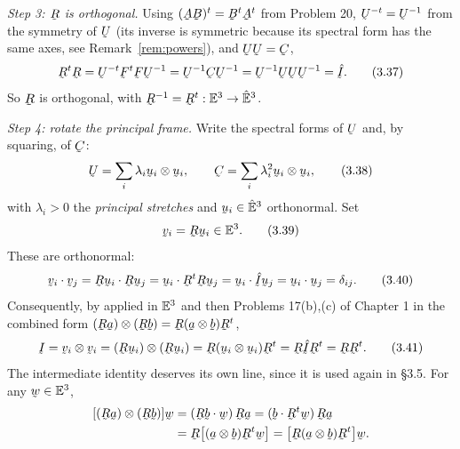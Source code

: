 \smallskip
\noindent
\emph{Step 3: $\bR$ is orthogonal.} Using $(\bA\bB)^{t}=\bB^{t}\bA^{t}$
from Problem 20, $\bU^{-t}=\bU^{-1}$ from the symmetry of $\bU$ (its
inverse is symmetric because its spectral form has the same axes, see
Remark~\ref{rem:powers}), and $\bU\bU=\bC$,
\begin{equation}
   \bR^{t}\bR=\bU^{-t}\bF^{t}\bF\bU^{-1}
             =\bU^{-1}\bC\bU^{-1}
             =\bU^{-1}\bU\bU\bU^{-1}=\hI .
   \tag{3.37}\label{eq:3.37}
\end{equation}
So $\bR$ is orthogonal, with $\bR^{-1}=\bR^{t}:\Vt\to\hVt$.

\smallskip
\noindent
\emph{Step 4: rotate the principal frame.} Write the spectral forms of
$\bU$ and, by squaring, of $\bC$:
\begin{equation}
   \bU=\sum_{i}\lambda_{i}\bu_{i}\otimes\bu_{i},
   \qquad
   \bC=\sum_{i}\lambda_{i}^{2}\bu_{i}\otimes\bu_{i},
   \tag{3.38}\label{eq:3.38}
\end{equation}
with $\lambda_{i}>0$ the \emph{principal stretches} and
$\bu_{i}\in\hVt$ orthonormal. Set
\begin{equation}
   \bv_{i}=\bR\bu_{i}\in\Vt .
   \tag{3.39}\label{eq:3.39}
\end{equation}
These are orthonormal:
\begin{equation}
   \ip{\bv_{i}}{\bv_{j}}=\ip{\bR\bu_{i}}{\bR\bu_{j}}
   =\ip{\bu_{i}}{\bR^{t}\bR\bu_{j}}=\ip{\bu_{i}}{\hI\bu_{j}}
   =\ip{\bu_{i}}{\bu_{j}}=\dd_{ij}.
   \tag{3.40}\label{eq:3.40}
\end{equation}
Consequently, by  applied in $\mathbb{E}^{3}$ and then Problems 17(b),(c) of
Chapter 1 in the combined form $(\bR\ba)\otimes(\bR\bb)=\bR(\ba\otimes
\bb)\bR^{t}$,
\begin{equation}
   \I=\bv_{i}\otimes\bv_{i}=(\bR\bu_{i})\otimes(\bR\bu_{i})
     =\bR(\bu_{i}\otimes\bu_{i})\bR^{t}=\bR\hI\bR^{t}=\bR\bR^{t}.
   \tag{3.41}\label{eq:3.41}
\end{equation}
The intermediate identity deserves its own line, since it is used again in
\S3.5. For any $\bw\in\Vt$,
\[
\begin{aligned}
   [(\bR\ba)\otimes(\bR\bb)]\bw
   &=(\ip{\bR\bb}{\bw})\,\bR\ba=(\ip{\bb}{\bR^{t}\bw})\,\bR\ba\\
   &=\bR\big[(\ba\otimes\bb)\bR^{t}\bw\big]
    =\big[\bR(\ba\otimes\bb)\bR^{t}\big]\bw .
\end{aligned}
\]

